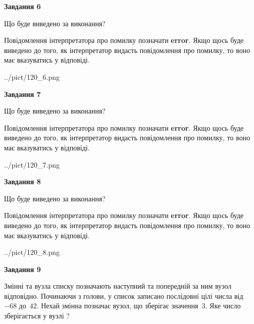 \documentclass[12pt, ukrainian]{article}
\begin{document}
{\begin {large}
{\begin {center}\textbf{Завдання 6}\end {center}}\par
Що буде виведено за виконання?

Повідомлення інтерпретатора про помилку позначати \textbf{error}.
Якщо щось буде виведено до того, як інтерпретатор видасть повідомлення про помилку, 
то воно має вказуватись у відповіді. \par


\begin{center}
	{../pict/120_6.png}
\end{center}
\newpage

{\begin {center}\textbf{Завдання 7}\end {center}}\par
Що буде виведено за виконання?

Повідомлення інтерпретатора про помилку позначати \textbf{error}.
Якщо щось буде виведено до того, як інтерпретатор видасть повідомлення про помилку, 
то воно має вказуватись у відповіді. \par


\begin{center}
	{../pict/120_7.png}
\end{center}
\newpage

{\begin {center}\textbf{Завдання 8}\end {center}}\par
Що буде виведено за виконання?

Повідомлення інтерпретатора про помилку позначати \textbf{error}.
Якщо щось буде виведено до того, як інтерпретатор видасть повідомлення про помилку, 
то воно має вказуватись у відповіді. \par


\begin{center}
	{../pict/120_8.png}
\end{center}
\newpage

{\begin {center}\textbf{Завдання 9}\end {center}}\par
Змінні  та  вузла списку позначають наступний та попередній за ним вузол відповідно. Починаючи з голови, у список записано послідовні цілі числа від~$-68$ до~$42$. Нехай змінна  позначає вузол, що зберігає значення~$3$.
Яке число зберігається у вузлі  ?\par
\newpage


\end{large}}
\end{document}
